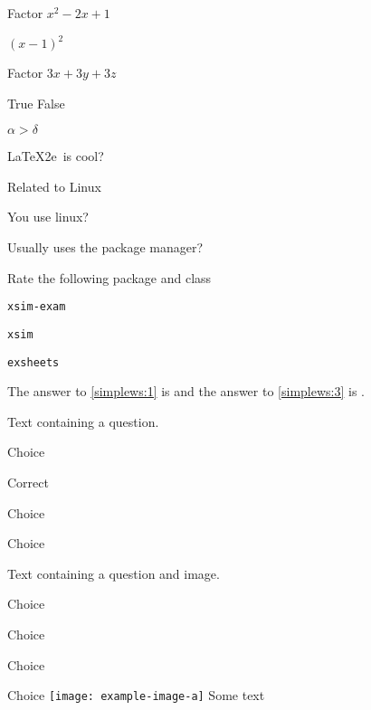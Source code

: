\documentclass{article}
\begin{document}
\begin{enumext}[save-ans=simplews,columns=2,check-ans=true,nosep,save-ref=true,wrap-label={\tikz[scale=0.25]\duck[signpost=\scalebox{0.6}{#1}];}]
  \item Factor $x^{2}-2x+1$ \begin{anskey*} $\left(x-1\right)^{2}$ \end{anskey*}
  \item Factor $3x+3y+3z$ 
  \item True False
    \begin{enumext}[nosep]
      \item $\alpha > \delta$ 
      \item \LaTeX2e\ is cool? 
    \end{enumext}
  \item Related to Linux
    \begin{enumext}[nosep]
      \item You use linux? 
      \item Usually uses the package manager? 
      \item Rate the following package and class
        \begin{enumext}[nosep]
          \item \texttt{xsim-exam} 
          \item \texttt{xsim} 
          \item \texttt{exsheets} 
        \end{enumext}
    \end{enumext}
\end{enumext}

The answer to \ref{simplews:1} is  and the answer
to \ref{simplews:3} is .




\begin{enumext}[save-ans=test,columns=1,show-ans=true]
  \item Text containing a question.
    \begin{keyans*}[list-offset={-\labelwidth-\labelsep},itemindent=0.5cm,nosep,columns=4]
      \item Choice
      \item* Correct
      \item Choice \newpage
      \item Choice
    \end{keyans*}
  \item Text containing a question and image.
    \begin{keyans}[nosep,mini-env={0.4\linewidth}]
      \item Choice
      \item Choice
      \item Choice
      \item* Choice
      \miniright
      \texttt{[image: example-image-a]}
      Some text
    \end{keyans}
\end{enumext}
\end{document}
